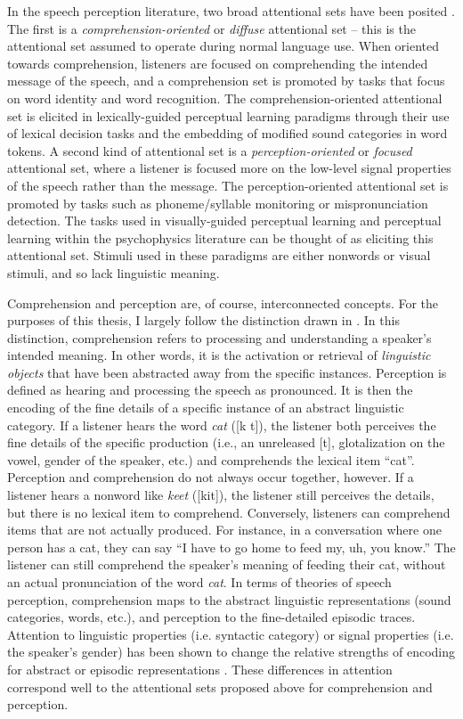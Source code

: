 In the speech perception literature, two broad attentional sets have been posited \citep{Cutler1987, Pitt2012}.  
The first is a \emph{comprehension-oriented} or \emph{diffuse} attentional set -- this is the attentional set assumed to operate during normal language use.  
When oriented towards comprehension, listeners are focused on comprehending the intended message of the speech, and a comprehension set is promoted by tasks that focus on word identity and word recognition.
The comprehension-oriented attentional set is elicited in lexically-guided perceptual learning paradigms through their use of lexical decision tasks and the embedding of modified sound categories in word tokens. 
A second kind of attentional set is a \emph{perception-oriented} or \emph{focused} attentional set, where a listener is focused more on the low-level signal properties of the speech rather than the message.
The perception-oriented attentional set is promoted by tasks such as phoneme/syllable monitoring or mispronunciation detection.
The tasks used in visually-guided perceptual learning and perceptual learning within the psychophysics literature can be thought of as eliciting this attentional set.
Stimuli used in these paradigms are either nonwords or visual stimuli, and so lack linguistic meaning.

Comprehension and perception are, of course, interconnected concepts. 
For the purposes of this thesis, I largely follow the distinction drawn in \citet{Pitt2012}.
In this distinction, comprehension refers to processing and understanding a speaker's intended meaning.
In other words, it is the activation or retrieval of \emph{linguistic objects} that have been abstracted away from the specific instances.
Perception is defined as hearing and processing the speech as pronounced.
It is then the encoding of the fine details of a specific instance of an abstract linguistic category. 
If a listener hears the word \emph{cat} ([k\textsubtilde{\ae} t\textcorner]), the listener both perceives the fine details of the specific production (i.e., an unreleased [t], glotalization on the vowel, gender of the speaker, etc.) and comprehends the lexical item ``cat''.
Perception and comprehension do not always occur together, however.
If a listener hears a nonword like \emph{keet} ([kit]), the listener still perceives the details, but there is no lexical item to comprehend.
Conversely, listeners can comprehend items that are not actually produced.
For instance, in a conversation where one person has a cat, they can say ``I have to go home to feed my, uh, you know.''
The listener can still comprehend the speaker's meaning of feeding their cat, without an actual pronunciation of the word \emph{cat}.
In terms of theories of speech perception, comprehension maps to the abstract linguistic representations (sound categories, words, etc.), and perception to the fine-detailed episodic traces.
Attention to linguistic properties (i.e. syntactic category) or signal properties (i.e. the speaker's gender) has been shown to change the relative strengths of encoding for abstract or episodic representations \citep{Goldinger1996,Theodore2015}.
These differences in attention correspond well to the attentional sets proposed above for comprehension and perception.

